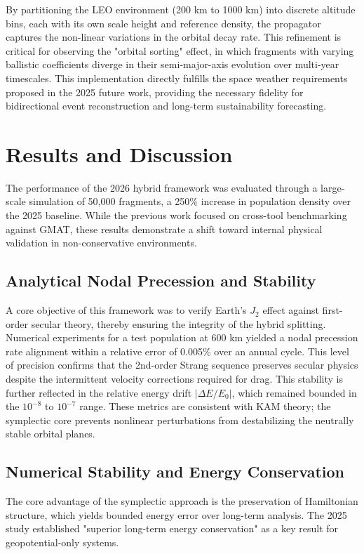 \documentclass[letterpaper,11pt]{AAS}
\begin{document}
By partitioning the LEO environment (200 km to 1000 km) into discrete altitude bins, each with its own scale height and reference density, the propagator captures the non-linear variations in the orbital decay rate. This refinement is critical for observing the "orbital sorting" effect, in which fragments with varying ballistic coefficients diverge in their semi-major-axis evolution over multi-year timescales. This implementation directly fulfills the space weather requirements proposed in the 2025 future work, providing the necessary fidelity for bidirectional event reconstruction and long-term sustainability forecasting.

\section{Results and Discussion}

The performance of the 2026 hybrid framework was evaluated through a large-scale simulation of 50,000 fragments, a 250\% increase in population density over the 2025 baseline. While the previous work focused on cross-tool benchmarking against GMAT, these results demonstrate a shift toward internal physical validation in non-conservative environments.

\subsection{Analytical Nodal Precession and Stability}
A core objective of this framework was to verify Earth's $J_2$ effect against first-order secular theory, thereby ensuring the integrity of the hybrid splitting. Numerical experiments for a test population at 600 km yielded a nodal precession rate alignment within a relative error of 0.005\% over an annual cycle. This level of precision confirms that the 2nd-order Strang sequence preserves secular physics despite the intermittent velocity corrections required for drag. This stability is further reflected in the relative energy drift $|\Delta E / E_0|$, which remained bounded in the $10^{-8}$ to $10^{-7}$ range. These metrics are consistent with KAM theory; the symplectic core prevents nonlinear perturbations from destabilizing the neutrally stable orbital planes.

\subsection{Numerical Stability and Energy Conservation}
The core advantage of the symplectic approach is the preservation of Hamiltonian structure, which yields bounded energy error over long-term analysis. The 2025 study established "superior long-term energy conservation" as a key result for geopotential-only systems. 
\end{document}
